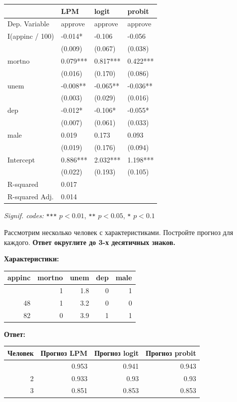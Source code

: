 \documentclass[
  russian,
]{article}
\newcounter{none} %
\begin{document}
{\def\LTcaptype{none} %
\begin{longtable}[]{@{}llll@{}}
\toprule\noalign{}
& LPM & logit & probit \\
\midrule\noalign{}
\endhead
\bottomrule\noalign{}
\endlastfoot
Dep. Variable & approve & approve & approve \\
I(appinc / 100) & -0.014* & -0.106 & -0.056 \\
& (0.009) & (0.067) & (0.038) \\
mortno & 0.079*** & 0.817*** & 0.422*** \\
& (0.016) & (0.170) & (0.086) \\
unem & -0.008** & -0.065** & -0.036** \\
& (0.003) & (0.029) & (0.016) \\
dep & -0.012* & -0.106* & -0.055* \\
& (0.007) & (0.061) & (0.033) \\
male & 0.019 & 0.173 & 0.093 \\
& (0.019) & (0.176) & (0.094) \\
Intercept & 0.886*** & 2.032*** & 1.198*** \\
& (0.022) & (0.193) & (0.105) \\
R-squared & 0.017 & & \\
R-squared Adj. & 0.014 & & \\
\end{longtable}
}

\emph{Signif. codes:} \texttt{***} \(p<0.01\), \texttt{**} \(p<0.05\),
\texttt{*} \(p<0.1\)

Рассмотрим несколько человек с характеристиками. Постройте прогноз для
каждого. \textbf{Ответ округлите до 3-х десятичных знаков.}

\textbf{Характеристики:}

{\def\LTcaptype{none} %
\begin{longtable}[]{@{}rrrrr@{}}
\toprule\noalign{}
appinc & mortno & unem & dep & male \\
\midrule\noalign{}
\endhead
\bottomrule\noalign{}
\endlastfoot
120 & 1 & 1.8 & 0 & 1 \\
48 & 1 & 3.2 & 0 & 0 \\
82 & 0 & 3.9 & 1 & 1 \\
\end{longtable}
}

\textbf{Ответ:}

{\def\LTcaptype{none} %
\begin{longtable}[]{@{}rrrr@{}}
\toprule\noalign{}
Человек & Прогноз LPM & Прогноз logit & Прогноз probit \\
\midrule\noalign{}
\endhead
\bottomrule\noalign{}
\endlastfoot
1 & 0.953 & 0.941 & 0.943 \\
2 & 0.933 & 0.93 & 0.93 \\
3 & 0.851 & 0.853 & 0.853 \\
\end{longtable}
}
\end{document}
